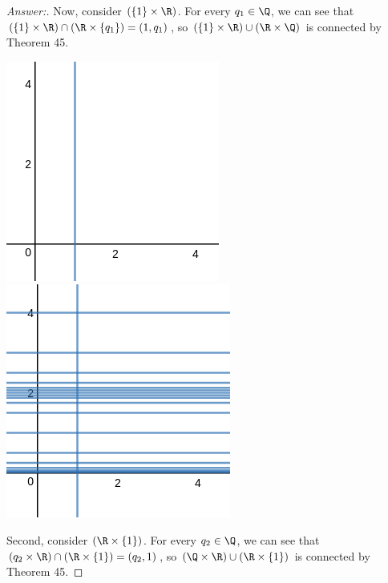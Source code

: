 \documentclass[letterpaper]{article}
\begin{document}
\begin{enumerate}
\begin{enumerate}
\begin{proof}[Answer:]
	 Now, consider $(\{1\}\times\R)$. For every $q_1\in\Q$, we can see that $(\{1\}\times\R) \cap (\R\times\{q_1\}) = (1,q_1)$, so $(\{1\}\times\R) \cup (\R\times\Q)$ is connected by Theorem 45. 

	\begin{center}
	\includegraphics[scale=.3]{hw10_prob1c_1}
	\quad
	\includegraphics[scale=.3]{hw10_prob1c_2}
	\end{center}
	 
	 Second, consider $(\R\times\{1\})$. For every $q_2\in\Q$, we can see that $(q_2\times\R) \cap (\R\times\{1\}) = (q_2,1)$, so $(\Q\times\R) \cup (\R\times\{1\})$ is connected by Theorem 45. 
	 

\end{proof}
\end{enumerate}
\end{enumerate}
\end{document}
